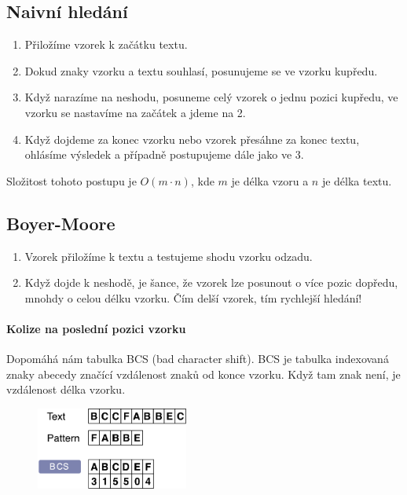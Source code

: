 \subsection{Naivní hledání}
\begin{enumerate}
\item Přiložíme vzorek k začátku textu.
\item Dokud znaky vzorku a textu souhlasí, posunujeme se ve vzorku kupředu.
\item Když narazíme na neshodu, posuneme celý vzorek o jednu pozici kupředu, ve vzorku se nastavíme na začátek a jdeme na 2.
\item Když dojdeme za konec vzorku nebo vzorek přesáhne za konec textu, ohlásíme výsledek a případně postupujeme dále jako ve 3.
\end{enumerate}

Složitost tohoto postupu je $O(m \cdot n)$, kde $m$ je délka vzoru a $n$ je délka textu.

\subsection{Boyer-Moore}
\begin{enumerate}
\item Vzorek přiložíme k textu a testujeme shodu vzorku odzadu.
\item Když dojde k neshodě, je šance, že vzorek lze posunout o více pozic dopředu, mnohdy o celou délku vzorku. Čím delší vzorek, tím rychlejší hledání!
\end{enumerate}
\paragraph{Kolize na poslední pozici vzorku}
Dopomáhá nám tabulka BCS (bad character shift). BCS je tabulka indexovaná znaky abecedy značící vzdálenost znaků od konce vzorku. Když tam znak není, je vzdálenost délka vzorku.

\begin{figure}[h]
    \begin{center}
        \includegraphics[width=50mm]{spolecne/04/images/bcs}
    \end{center}
\end{figure}

